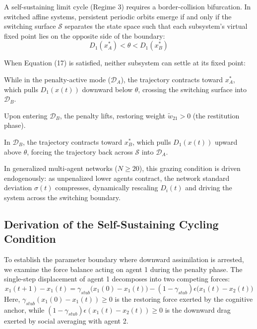 A self-sustaining limit cycle (Regime 3) requires a border-collision bifurcation\cite{acemoglu2013opinion,hajnal1958weak}. In switched affine systems, persistent periodic orbits emerge if and only if the switching surface $\mathcal{S}$ separates the state space such that each subsystem's virtual fixed point lies on the opposite side of the boundary\cite{acemoglu2013opinion}: $$D_1(x_A^*) < \theta < D_1(x_B^*)$$

When Equation (17) is satisfied, neither subsystem can settle at its fixed point\cite{acemoglu2013opinion}:

While in the penalty-active mode ($\mathcal{D}_A$), the trajectory contracts toward $x_A^*$, which pulls $D_1(x(t))$ downward below $\theta$, crossing the switching surface into $\mathcal{D}_B$\cite{degroot1974reaching,acemoglu2013opinion}.

Upon entering $\mathcal{D}_B$, the penalty lifts, restoring weight $\tilde{w}_{21} > 0$ (the restitution phase)\cite{degroot1974reaching,acemoglu2013opinion}.

In $\mathcal{D}_B$, the trajectory contracts toward $x_B^*$, which pulls $D_1(x(t))$ upward above $\theta$, forcing the trajectory back across $\mathcal{S}$ into $\mathcal{D}_A$\cite{degroot1974reaching,acemoglu2013opinion}.

In generalized multi-agent networks ($N \ge 20$), this grazing condition is driven endogenously: as unpenalized lower agents contract, the network standard deviation $\sigma(t)$ compresses, dynamically rescaling $D_i(t)$ and driving the system across the switching boundary\cite{acemoglu2013opinion,hajnal1958weak}.

\subsection{Derivation of the Self-Sustaining Cycling Condition}
To establish the parameter boundary where downward assimilation is arrested, we examine the force balance acting on agent 1 during the penalty phase\cite{degroot1974reaching,acemoglu2013opinion}. The single-step displacement of agent 1 decomposes into two competing forces\cite{acemoglu2013opinion}: $$x_1(t+1) - x_1(t) = \gamma_{stub} \big(x_1(0) - x_1(t)\big) - (1 - \gamma_{stub}) \epsilon \big(x_1(t) - x_2(t)\big)$$ Here, $\gamma_{stub} (x_1(0) - x_1(t)) \ge 0$ is the restoring force exerted by the cognitive anchor, while $(1 - \gamma_{stub}) \epsilon (x_1(t) - x_2(t)) \ge 0$ is the downward drag exerted by social averaging with agent 2\cite{acemoglu2013opinion}.

